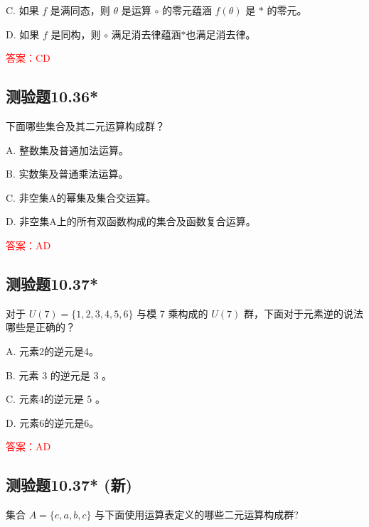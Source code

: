 \documentclass[UTF8, heading=true]{ctexart}
\begin{document}
C. 如果 $f$ 是满同态，则 $\theta$ 是运算 $\circ$ 的零元蕴涵 $f(\theta)$ 是 $*$ 的零元。

D. 如果 $f$ 是同构，则 $\circ$ 满足消去律蕴涵$*$也满足消去律。

\textcolor{red}{答案：CD}

\subsection{测验题10.36*}

下面哪些集合及其二元运算构成群？

A. 整数集及普通加法运算。

B. 实数集及普通乘法运算。

C. 非空集A的幂集及集合交运算。

D. 非空集A上的所有双函数构成的集合及函数复合运算。

\textcolor{red}{答案：AD}

\subsection{测验题10.37*}

对于 $U(7)=\{1,2,3,4,5,6\}$ 与模 7 乘构成的 $U(7)$ 群，下面对于元素逆的说法哪些是正确的？

A. 元素2的逆元是4。

B. 元素 3 的逆元是 3 。

C. 元素4的逆元是 5 。

D. 元素6的逆元是6。

\textcolor{red}{答案：AD}

\subsection{测验题10.37* (新)}

集合 $A=\{e, a, b, c\}$  与下面使用运算表定义的哪些二元运算构成群?
\end{document}
